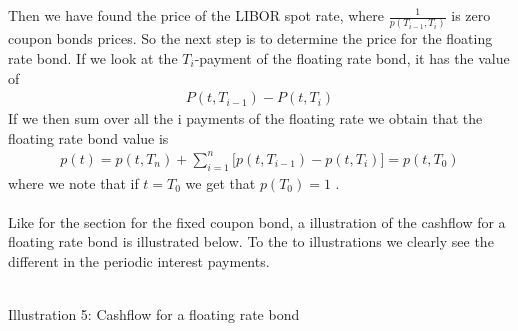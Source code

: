 Then we have found the price of the LIBOR spot rate, where $\frac{1}{p(T_{i-1},T_i)}$ is zero coupon bonds prices. 
So the next step is to determine the price for the floating rate bond. If we look at the $T_i$-payment of the floating rate bond, 
it has the value of
\begin{align*}
    P(t,T_{i-1})-P(t,T_i)
\end{align*}
If we then sum over all the i payments of the floating rate we obtain that the floating rate bond value is
\begin{align*}
    p(t)= p(t,T_n) + \sum_{i=1}^{n}\Big[p(t,T_{i-1})-p(t,T_i)\Big] = p(t,T_0) 
\end{align*}
where we note that if $t=T_0$ we get that $p(T_0)=1$ \cite{Bjork}. \\\\
Like for the section for the fixed coupon bond, a illustration of the cashflow for a floating rate bond is illustrated below.
To the to illustrations we clearly see the different in the periodic interest payments. 
\begin{center}
    \\[10pt] 
    Illustration 5: Cashflow for a floating rate bond
\end{center}
